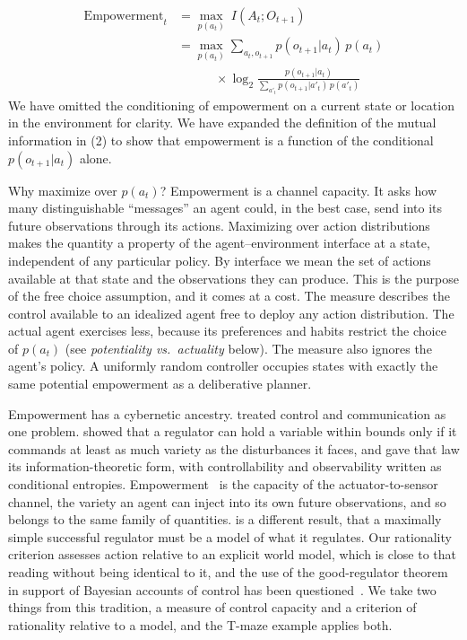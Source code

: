 \documentclass[letterpaper]{article} %
\theoremstyle{definition}
\begin{document}
\begin{align}
\text{Empowerment}_t &= \underset{p(a_t)}{\max}\ I(A_t ; O_{t+1}) \\
 &= \underset{p(a_t)}{\max}\sum_{a_t, o_{t+1}} p(o_{t+1}|a_t)\, p(a_t) \nonumber\\
 &\qquad\quad \times \log_2 \frac{p(o_{t+1}|a_t)}{\sum_{a'_t} p(o_{t+1}|a'_t)\, p(a'_t)}
\end{align}
We have omitted the conditioning of empowerment on a current state or location in the environment for clarity. We have expanded the definition of the mutual information in (2) to show that empowerment is a function of the conditional $p(o_{t+1}|a_t)$ alone.

Why maximize over $p(a_t)$? Empowerment is a channel capacity. It asks how many distinguishable ``messages'' an agent could, in the best case, send into its future observations through its actions. Maximizing over action distributions makes the quantity a property of the agent--environment interface at a state, independent of any particular policy. By interface we mean the set of actions available at that state and the observations they can produce. This is the purpose of the free choice assumption, and it comes at a cost. The measure describes the control available to an idealized agent free to deploy any action distribution. The actual agent exercises less, because its preferences and habits restrict the choice of $p(a_t)$ (see \emph{potentiality vs.\ actuality} below). The measure also ignores the agent's policy. A uniformly random controller occupies states with exactly the same potential empowerment as a deliberative planner.

Empowerment has a cybernetic ancestry. \citet{wienerCybernetics1948} treated control and communication as one problem. \citet{ashbyIntroductionCybernetics1956} showed that a regulator can hold a variable within bounds only if it commands at least as much variety as the disturbances it faces, and \citet{touchetteInformationTheoreticLimits2000,touchetteInformationTheoreticControl2004} gave that law its information-theoretic form, with controllability and observability written as conditional entropies. Empowerment~\citep{Klyubin2005empowerment,klyubinKeepYourOptions2008} is the capacity of the actuator-to-sensor channel, the variety an agent can inject into its own future observations, and so belongs to the same family of quantities. \citet{conantGoodRegulator1970} is a different result, that a maximally simple successful regulator must be a model of what it regulates. Our rationality criterion assesses action relative to an explicit world model, which is close to that reading without being identical to it, and the use of the good-regulator theorem in support of Bayesian accounts of control has been questioned~\citep{baltieriWattGovernors2020}. We take two things from this tradition, a measure of control capacity and a criterion of rationality relative to a model, and the T-maze example applies both.
\end{document}
